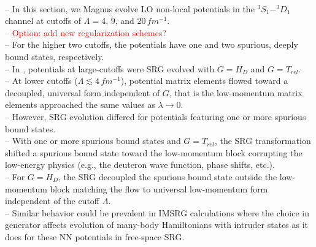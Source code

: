 \documentclass[preprintnumbers,floatfix,aps,prc,preprint,nofootinbib]{revtex4-1}
\begin{document}
\\
-- In this section, we Magnus evolve LO non-local potentials in the $^{3}S_1-^{3}D_1$ channel at cutoffs of $\Lambda=4$, $9$, and $20 \, fm^{-1}$.
\\
\textcolor{red}{-- Option: add new regularization schemes?}
\\
-- For the higher two cutoffs, the potentials have one and two spurious, deeply bound states, respectively.
\\
-- In \cite{Wendt:2011qj}, potentials at large-cutoffs were SRG evolved with $G=H_D$ and $G=T_{rel}$.
\\
-- At lower cutoffs ($\Lambda \lesssim 4 \, fm^{-1}$), potential matrix elements flowed toward a decoupled, universal form independent of $G$, that is the low-momentum matrix elements approached the same values as $\lambda \rightarrow 0$.
\\
-- However, SRG evolution differed for potentials featuring one or more spurious bound states.
\\
-- With one or more spurious bound states and $G=T_{rel}$, the SRG transformation shifted a spurious bound state toward the low-momentum block corrupting the low-energy physics (e.g., the deuteron wave function, phase shifts, etc.).
\\
-- For $G=H_D$, the SRG decoupled the spurious bound state outside the low-momentum block matching the flow to universal low-momentum form independent of the cutoff $\Lambda$.
\\
-- Similar behavior could be prevalent in IMSRG calculations where the choice in generator affects evolution of many-body Hamiltonians with intruder states as it does for these NN potentials in free-space SRG.
\\
\end{document}
